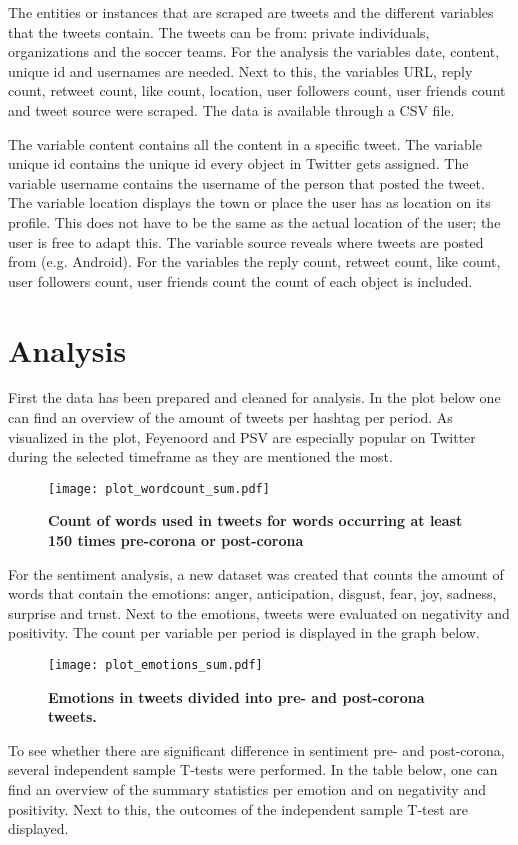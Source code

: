 \documentclass[12pt]{article}
\begin{document}
The entities or instances that are scraped are tweets and the different variables that the tweets contain. The tweets can be from: private individuals, organizations and the soccer teams. For the analysis the variables date, content, unique id and usernames are needed. Next to this, the variables URL, reply count, retweet count, like count, location, user followers count, user friends count and tweet source were scraped. The data is available through a CSV file.

The variable content contains all the content in a specific tweet. The variable unique id contains the unique id every object in Twitter gets assigned. The variable username contains the username of the person that posted the tweet. The variable location displays the town or place the user has as location on its profile. This does not have to be the same as the actual location of the user; the user is free to adapt this. The variable source reveals where tweets are posted from (e.g. Android). For the variables the reply count, retweet count, like count, user followers count, user friends count the count of each object is included.

\section{Analysis}
First the data has been prepared and cleaned for analysis. In the plot below one can find an overview of the amount of tweets per hashtag per period. As visualized in the plot, Feyenoord and PSV are especially popular on Twitter during the selected timeframe as they are mentioned the most.


\begin{figure}[H]
\caption{\textbf{Count of words used in tweets for words occurring at least 150 times pre-corona or post-corona}}
\texttt{[image: plot\_wordcount\_sum.pdf]}

\end{figure}
For the sentiment analysis, a new dataset was created that counts the amount of words that contain the emotions: anger, anticipation, disgust, fear, joy, sadness, surprise and trust. Next to the emotions, tweets were evaluated on negativity and positivity. The count per variable per period is displayed in the graph below.

\begin{figure}[H]
\caption{\textbf{Emotions in tweets divided into pre- and post-corona tweets.}}
\texttt{[image: plot\_emotions\_sum.pdf]}

\end{figure}
To see whether there are significant difference in sentiment pre- and post-corona, several independent sample T-tests were performed. In the table below, one can find an overview of the summary statistics per emotion and on negativity and positivity. Next to this, the outcomes of the independent sample T-test are displayed.
\end{document}

